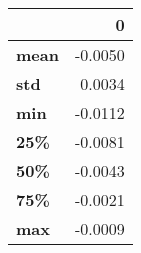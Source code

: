 \begin{tabular}{lr}
\toprule
{} &       0 \\
\midrule
\textbf{mean} & -0.0050 \\
\textbf{std } &  0.0034 \\
\textbf{min } & -0.0112 \\
\textbf{25\% } & -0.0081 \\
\textbf{50\% } & -0.0043 \\
\textbf{75\% } & -0.0021 \\
\textbf{max } & -0.0009 \\
\bottomrule
\end{tabular}
